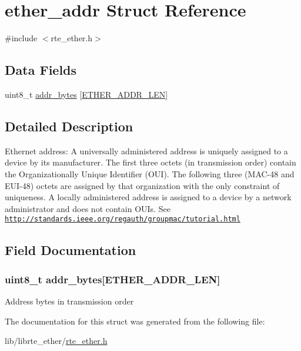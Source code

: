 \hypertarget{structether__addr}{}\section{ether\+\_\+addr Struct Reference}
\label{structether__addr}


{\ttfamily \#include $<$rte\+\_\+ether.\+h$>$}

\subsection*{Data Fields}
\begin{DoxyCompactItemize}
\item 
uint8\+\_\+t \hyperlink{structether__addr_a17e6cc2bacfdff827dfbe413871ee2bc}{addr\+\_\+bytes} \mbox{[}\hyperlink{rte__ether_8h_abf4fcaacb1ad2010711b7c880ec2ed20}{E\+T\+H\+E\+R\+\_\+\+A\+D\+D\+R\+\_\+\+L\+E\+N}\mbox{]}
\end{DoxyCompactItemize}


\subsection{Detailed Description}
Ethernet address\+: A universally administered address is uniquely assigned to a device by its manufacturer. The first three octets (in transmission order) contain the Organizationally Unique Identifier (O\+U\+I). The following three (M\+A\+C-\/48 and E\+U\+I-\/48) octets are assigned by that organization with the only constraint of uniqueness. A locally administered address is assigned to a device by a network administrator and does not contain O\+U\+Is. See \href{http://standards.ieee.org/regauth/groupmac/tutorial.html}{\tt http\+://standards.\+ieee.\+org/regauth/groupmac/tutorial.\+html} 

\subsection{Field Documentation}
\hypertarget{structether__addr_a17e6cc2bacfdff827dfbe413871ee2bc}{}
\subsubsection[{addr\+\_\+bytes}]{\setlength{\rightskip}{0pt plus 5cm}uint8\+\_\+t addr\+\_\+bytes\mbox{[}{\bf E\+T\+H\+E\+R\+\_\+\+A\+D\+D\+R\+\_\+\+L\+E\+N}\mbox{]}}\label{structether__addr_a17e6cc2bacfdff827dfbe413871ee2bc}
Address bytes in transmission order 

The documentation for this struct was generated from the following file\+:\begin{DoxyCompactItemize}
\item 
lib/librte\+\_\+ether/\hyperlink{rte__ether_8h}{rte\+\_\+ether.\+h}\end{DoxyCompactItemize}
